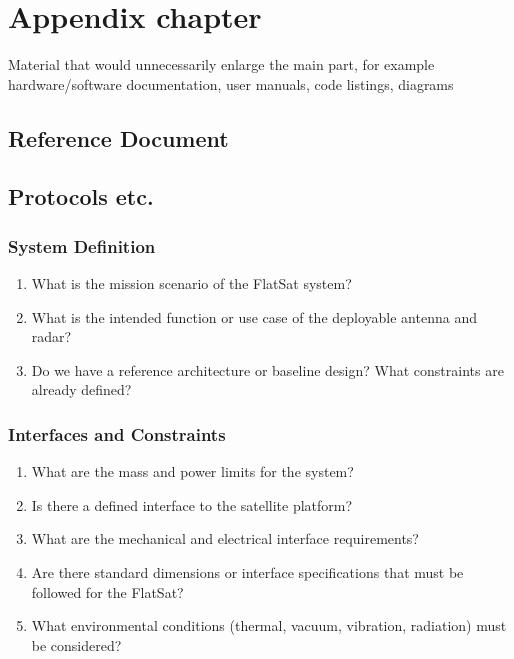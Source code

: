 \chapter{Appendix chapter}
\label{sec:a-kapitel}

Material that would unnecessarily enlarge the main part, for example hardware/software documentation, user manuals, code listings, diagrams
\newpage
	\section{Reference Document}\label{doc:Antenna}
	
	\section{Protocols etc.}

	\subsection{System Definition}
	
	\begin{enumerate}
		\item What is the mission scenario of the FlatSat system?
		\item What is the intended function or use case of the deployable antenna and radar?
		\item Do we have a reference architecture or baseline design? What constraints are already defined?
	\end{enumerate}
	
	\subsection{Interfaces and Constraints}
	
	\begin{enumerate}
		\item What are the mass and power limits for the system?
		\item Is there a defined interface to the satellite platform?
		\item What are the mechanical and electrical interface requirements?
		\item Are there standard dimensions or interface specifications that must be followed for the FlatSat?
		\item What environmental conditions (thermal, vacuum, vibration, radiation) must be considered?
	\end{enumerate}
	
